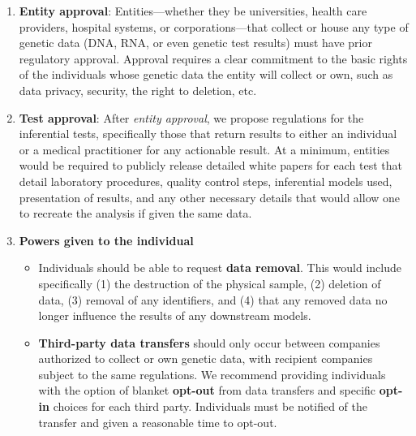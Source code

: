 \begin{enumerate}
    \item \textbf{Entity approval}: Entities—whether they be universities, health care providers, hospital systems, or corporations—that collect or house any type of genetic data (DNA, RNA, or even genetic test results) must have prior regulatory approval. Approval requires a clear commitment to the basic rights of the individuals whose genetic data the entity will collect or own, such as data privacy, security, the right to deletion, etc. 
    
    \item \textbf{Test approval}: After \emph{entity approval}, we propose regulations for the inferential tests, specifically those that return results to either an individual or a medical practitioner for any actionable result. At a minimum, entities would be required to publicly release detailed white papers for each test that detail laboratory procedures, quality control steps, inferential models used, presentation of results, and any other necessary details that would allow one to recreate the analysis if given the same data. 
    
    \item \textbf{Powers given to the individual}
    \begin{itemize}
        \item Individuals should be able to request \textbf{data removal}. This would include specifically (1) the destruction of the physical sample, (2) deletion of data, (3) removal of any identifiers, and (4) that any removed data no longer influence the results of any downstream models. 
        
        \item \textbf{Third-party data transfers} should only occur between companies authorized to collect or own genetic data, with recipient companies subject to the same regulations. We recommend providing individuals with the option of blanket \textbf{opt-out} from data transfers and specific \textbf{opt-in} choices for each third party. Individuals must be notified of the transfer and given a reasonable time to opt-out. 


\end{itemize}
\end{enumerate}
